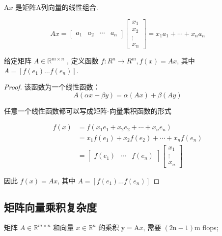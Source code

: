 \begin{corollary}
    $ \mathrm{A} x $ 是矩阵A列向量的线性组合.

$$
A x=\left[\begin{array}{llll}
a_{1} & a_{2} & \cdots & a_{n}
\end{array}\right]\left[\begin{array}{c}
x_{1} \\
x_{2} \\
\vdots \\
x_{n}
\end{array}\right]=x_{1} a_{1}+\cdots+x_{n} a_{n}
$$
\end{corollary}

\begin{definition}[矩阵-向量乘积函数 $f(x)=A x$]
    给定矩阵 $ A \in \mathbb{R}^{m \times n} $ , 定义函数 $ f: R^{n} \rightarrow R^{m}, f(x)=A x $, 其中 $ A=\left[f\left(e_{1}\right) \ldots f\left(e_{n}\right)\right] $.
\end{definition}

\begin{proof}
    该函数为一个线性函数： $$ A(\alpha x+\beta y)=\alpha(A x)+\beta(A y) $$ 
    
    任意一个线性函数都可以写成矩阵-向量乘积函数的形式

    $$ \begin{aligned} f(x) &=f\left(x_{1} e_{1}+x_{2} e_{2}+\cdots+x_{n} e_{n}\right) \\ &=x_{1} f\left(e_{1}\right)+x_{2} f\left(e_{2}\right)+\cdots+x_{n} f\left(e_{n}\right) \\ &=\left[\begin{array}{lll}f\left(e_{1}\right) & \cdots & f\left(e_{n}\right)\end{array}\right]\left[\begin{array}{c}x_{1} \\ \vdots \\ x_{n}\end{array}\right] \end{aligned} $$

    因此 $ f(x)=A x $, 其中 $ A=\left[f\left(e_{1}\right) \ldots f\left(e_{n}\right)\right] $
\end{proof}

\subsection{矩阵向量乘积复杂度}

矩阵 $ A \in \mathbb{R}^{m \times n} $ 和向量 $ x \in \mathbb{R}^{n} $ 的乘积 $ \mathrm{y}=\mathrm{A} x $, 需要 $ (2 \mathrm{n}-1) \mathrm{m} $ flops;

